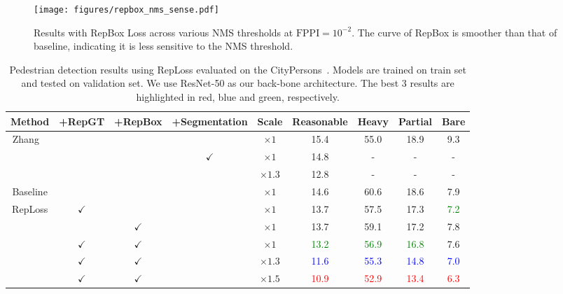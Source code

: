 \documentclass[10pt,twocolumn,letterpaper]{article}
\begin{document}
\begin{figure}[t]
\texttt{[image: figures/repbox\_nms\_sense.pdf]}
\caption{Results with RepBox Loss across various NMS thresholds at $\mathrm{FPPI}=10^{-2}$. The curve of RepBox is smoother than that of baseline, indicating it is less sensitive to the NMS threshold.}
\vspace{-0.2cm}
\label{fig:RepBox_nms}
\end{figure}

\begin{table*}[!ht]
\begin{center}
 		\begin{tabular}{c|cccc|c|ccc}
 		\hline\hline
 		Method & +RepGT & +RepBox & +Segmentation & Scale & Reasonable & Heavy & Partial & Bare\\
 		\hline\hline
 		\multirow{3}{*}{Zhang \etal~\cite{zhang2017citypersons}} & & & & $\times{}1$ & 15.4 & 55.0 & 18.9 & 9.3 \\
 		& & & $\checkmark$ & $\times{}1$ & 14.8 & - & - & - \\
 		& & & & $\times{}1.3$ & 12.8 & - & - & -\\
 		\hline
 		Baseline & & & & $\times{}1$ & 14.6 & 60.6 & 18.6 & 7.9 \\
 		\hline
 		RepLoss & $\checkmark$ & & & $\times{}1$ & 13.7 & 57.5 & 17.3 & \textcolor{green}{7.2} \\
 		& & $\checkmark$ & & $\times{}1$ & 13.7 & 59.1 & 17.2 & 7.8 \\
 		& $\checkmark$ & $\checkmark$  & & $\times{}1$ & \textcolor{green}{13.2} & \textcolor{green}{56.9} & \textcolor{green}{16.8} & 7.6 \\
 		& $\checkmark$ & $\checkmark$  & & $\times{}1.3$ & \textcolor{blue}{11.6} & \textcolor{blue}{55.3}  & \textcolor{blue}{14.8} & \textcolor{blue}{7.0} \\
 		& $\checkmark$ & $\checkmark$  & & $\times{}1.5$ & \textcolor{red}{10.9} & \textcolor{red}{52.9}  & \textcolor{red}{13.4} & \textcolor{red}{6.3} \\
 		\end{tabular}
 	\end{center}
 	\caption{Pedestrian detection results using RepLoss evaluated on the CityPersons~\cite{zhang2017citypersons}. Models are trained on train set and tested on validation set. We use ResNet-50 as our back-bone architecture. The best 3 results are highlighted in red, blue and green, respectively.}
 	\label{tab:citypersons_results}
\end{table*}
\end{document}
